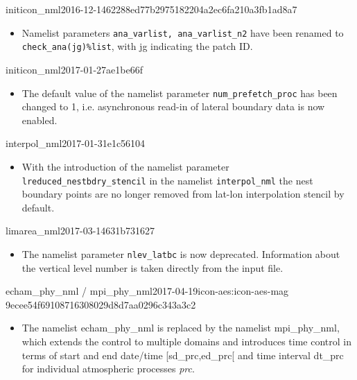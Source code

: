 \begin{changeitem}{initicon\_nml}{2016-12-14}{62288ed77b2975182204a2ec6fa210a3fb1ad8a7}
  \begin{itemize}
   \item Namelist parameters \texttt{ana\_varlist, ana\_varlist\_n2} have been renamed to \texttt{check\_ana(jg)\%list},
   with jg indicating the patch ID.
  \end{itemize}
\end{changeitem}

\begin{changeitem}{initicon\_nml}{2017-01-27}{ae1be66f}
  \begin{itemize}
   \item The default value of the namelist parameter
     \texttt{num\_prefetch\_proc} has been changed to 1,
     i.e. asynchronous read-in of lateral boundary data is now
     enabled.
  \end{itemize}
\end{changeitem}

\begin{changeitem}{interpol\_nml}{2017-01-31}{e1c56104}
  \begin{itemize}
   \item With the introduction of the namelist parameter
     \texttt{lreduced\_nestbdry\_stencil} in the namelist
     \texttt{interpol\_nml} the nest boundary points are no longer
     removed from lat-lon interpolation stencil by default.
  \end{itemize}
\end{changeitem}

\begin{changeitem}{limarea\_nml}{2017-03-14}{631b731627}
  \begin{itemize}
   \item The namelist parameter \texttt{nlev\_latbc} is now
     deprecated. Information about the vertical level number is taken
     directly from the input file.
  \end{itemize}
\end{changeitem}

\begin{changeitem}{echam\_phy\_nml / mpi\_phy\_nml}{2017-04-19}{icon-aes:icon-aes-mag 9ecee54f69108716308029d8d7aa0296c343a3c2}
  \begin{itemize}
   \item The namelist echam\_phy\_nml is replaced by the namelist mpi\_phy\_nml, which extends the control to multiple domains and introduces time control in terms of start and end date/time [sd\_prc,ed\_prc[ and time interval dt\_prc for individual atmospheric processes \textit{prc}.
  \end{itemize}
\end{changeitem}

